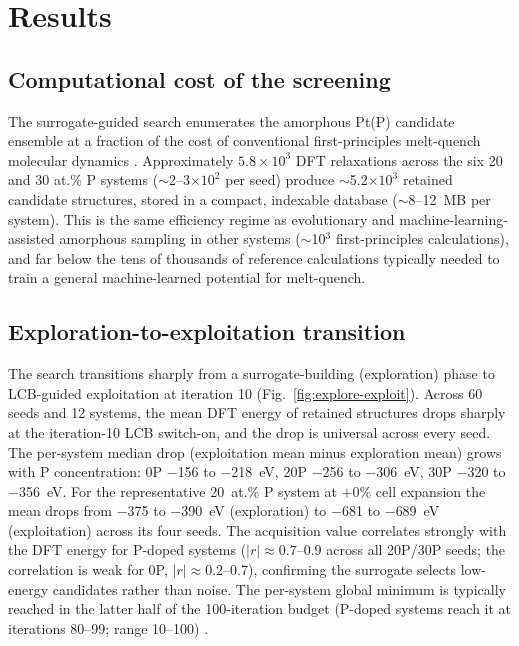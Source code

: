 
\section{Results}\label{sec:results}

\subsection{Computational cost of the screening}\label{sec:results-cost}

The surrogate-guided search enumerates the amorphous Pt(P) candidate
ensemble at a fraction of the cost of conventional first-principles
melt-quench molecular dynamics \cite{meltquench2026,artrith2018,nahas2016,activemlp2020}.
Approximately $5.8\times10^{3}$ DFT relaxations across the six 20 and 30 at.\% P systems
($\sim$2--3$\times10^{2}$ per seed) produce $\sim$5.2$\times10^{3}$ retained
candidate structures, stored in a compact, indexable database ($\sim$8--12~MB
per system). This is the same efficiency regime as evolutionary and
machine-learning-assisted amorphous sampling in other systems
($\sim$10$^{3}$ first-principles calculations), and far below the tens of
thousands of reference calculations typically needed to train a general
machine-learned potential for melt-quench.

\subsection{Exploration-to-exploitation transition}\label{sec:results-explore}

The search transitions sharply from a surrogate-building (exploration) phase
to LCB-guided exploitation at iteration 10 (Fig.~\ref{fig:explore-exploit}).
Across 60 seeds and 12 systems,
the mean DFT energy of retained structures drops sharply at the iteration-10
LCB switch-on, and the drop is universal across every seed. The per-system
median drop (exploitation mean minus exploration mean) grows with P concentration:
0P $-$156 to $-$218~eV, 20P $-$256 to $-$306~eV, 30P $-$320 to $-$356~eV. For
the representative 20~at.\% P system at $+0\%$ cell expansion the mean drops from
$-$375 to $-$390~eV (exploration) to $-$681 to $-$689~eV (exploitation) across
its four seeds. The acquisition value correlates strongly with the DFT energy
for P-doped systems ($|r| \approx 0.7$--0.9 across all 20P/30P seeds; the
correlation is weak for 0P, $|r| \approx 0.2$--0.7), confirming the surrogate
selects low-energy candidates rather than noise. The per-system global minimum
is typically reached in the latter half of the 100-iteration budget (P-doped
systems reach it at iterations 80--99; range 10--100) \cite{gofee2022}.

